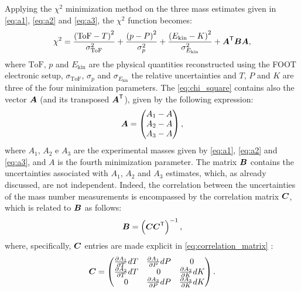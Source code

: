 Applying the $\chi^2$ minimization method on the three mass estimates given in \autoref{eq:a1}, \autoref{eq:a2} and \autoref{eq:a3}, the $\chi^2$ function becomes:
\begin{equation}
	\chi^2=\frac{\left(\text{ToF}-T\right)^2}{\sigma^2_{\text{ToF}}}+\frac{\left(p-P\right)^2}{\sigma^2_{p}}+\frac{\left(E_\text{kin}-K\right)^2}{\sigma^2_{E_\text{kin}}}+{\boldsymbol{A}}^{\mathsf{T}}\boldsymbol{B}\boldsymbol{A},
	\label{eq:chi_square}
\end{equation}
where $\text{ToF}$, $p$ and $E_\text{kin}$ are the physical quantities reconstructed using the FOOT electronic setup, $\sigma_{\text{ToF}}$, $\sigma_{p}$ and $\sigma_{E_\text{kin}}$ the relative uncertainties and $T$, $P$ and $K$ are three of the four minimization parameters. The \autoref{eq:chi_square} contains also the vector $\boldsymbol{A}$ (and its transposed ${\boldsymbol{A}}^{\mathsf{T}}$), given by the following expression:
\begin{equation}
	\boldsymbol{A}=
	\begin{pmatrix}
		A_1-A\\
		A_2-A \\
		A_3-A\\
	\end{pmatrix}
	,
	\label{eq:vector_A}
\end{equation}
where $A_1$, $A_2$ e $A_3$ are the experimental masses given by \autoref{eq:a1}, \autoref{eq:a2} and \autoref{eq:a3}, and $A$ is the fourth minimization parameter. The matrix $\boldsymbol{B}$ contains the uncertainties associated with $A_1$, $A_2$ and $A_3$ estimates, which, as already discussed, are not independent. Indeed, the correlation between the uncertainties of the mass number measurements is encompassed by the correlation matrix $\boldsymbol{C}$, which is related to $\boldsymbol{B}$ as follows:
\begin{equation}
	\boldsymbol{B}=\left(\boldsymbol{C}{\boldsymbol{C}}^{\mathsf{T}}\right)^{-1},
	\label{eq:B_funct_C}
\end{equation}
where, specifically, $\boldsymbol{C}$ entries are made explicit in \autoref{eq:correlation_matrix} \cite{foot_cdr,valle2019design}:
\begin{equation}
	\boldsymbol{C}=
	\begin{pmatrix}
		\frac{\partial A_1}{\partial T}dT&\frac{\partial A_1}{\partial P}dP&0\\
		\frac{\partial A_2}{\partial T}dT&0&\frac{\partial A_2}{\partial K}dK\\
		0&\frac{\partial A_3}{\partial P}dP&\frac{\partial A_3}{\partial K}dK\\
	\end{pmatrix}
	.
	\label{eq:correlation_matrix}
\end{equation}

